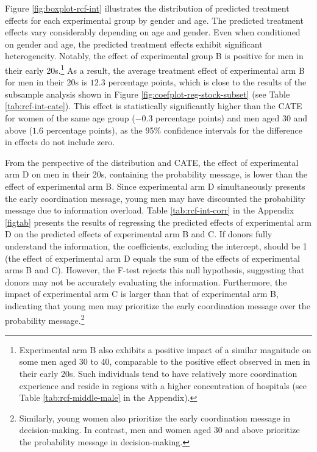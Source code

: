\documentclass[12pt, a4paper]{article}
\begin{document}
Figure \ref{fig:boxplot-rcf-int} illustrates the distribution of predicted treatment effects for each experimental group by gender and age. The predicted treatment effects vary considerably depending on age and gender. Even when conditioned on gender and age, the predicted treatment effects exhibit significant heterogeneity. Notably, the effect of experimental group B is positive for men in their early 20s.\footnote{Experimental arm B also exhibits a positive impact of a similar magnitude on some men aged 30 to 40, comparable to the positive effect observed in men in their early 20s. Such individuals tend to have relatively more coordination experience and reside in regions with a higher concentration of hospitals (see Table \ref{tab:rcf-middle-male} in the Appendix).} As a result, the average treatment effect of experimental arm B for men in their 20s is \(12.3\) percentage points, which is close to the results of the subsample analysis shown in Figure \ref{fig:coefplot-reg-stock-subset} (see Table \ref{tab:rcf-int-cate}). This effect is statistically significantly higher than the CATE for women of the same age group (\(-0.3\) percentage points) and men aged 30 and above (\(1.6\) percentage points), as the 95\% confidence intervals for the difference in effects do not include zero.

From the perspective of the distribution and CATE, the effect of experimental arm D on men in their 20s, containing the probability message, is lower than the effect of experimental arm B. Since experimental arm D simultaneously presents the early coordination message, young men may have discounted the probability message due to information overload. Table \ref{tab:rcf-int-corr} in the Appendix \ref{figtab} presents the results of regressing the predicted effects of experimental arm D on the predicted effects of experimental arm B and C. If donors fully understand the information, the coefficients, excluding the intercept, should be 1 (the effect of experimental arm D equals the sum of the effects of experimental arms B and C). However, the F-test rejects this null hypothesis, suggesting that donors may not be accurately evaluating the information. Furthermore, the impact of experimental arm C is larger than that of experimental arm B, indicating that young men may prioritize the early coordination message over the probability message.\footnote{Similarly, young women also prioritize the early coordination message in decision-making. In contrast, men and women aged 30 and above prioritize the probability message in decision-making.}
\end{document}
